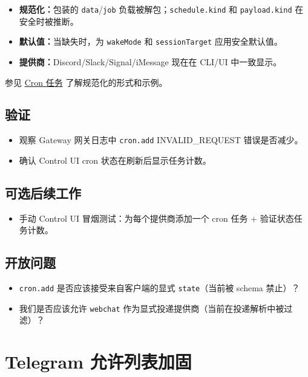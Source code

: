 \begin{itemize}
  \item \textbf{规范化：}包装的 \texttt{data}/\texttt{job} 负载被解包；\texttt{schedule.kind} 和 \texttt{payload.kind} 在安全时被推断。
  \item \textbf{默认值：}当缺失时，为 \texttt{wakeMode} 和 \texttt{sessionTarget} 应用安全默认值。
  \item \textbf{提供商：}Discord/Slack/Signal/iMessage 现在在 CLI/UI 中一致显示。
\end{itemize}


参见 \href{/automation/cron-jobs}{Cron 任务} 了解规范化的形式和示例。

\subsection{验证}


\begin{itemize}
  \item 观察 Gateway 网关日志中 \texttt{cron.add} INVALID\_REQUEST 错误是否减少。
  \item 确认 Control UI cron 状态在刷新后显示任务计数。
\end{itemize}


\subsection{可选后续工作}


\begin{itemize}
  \item 手动 Control UI 冒烟测试：为每个提供商添加一个 cron 任务 + 验证状态任务计数。
\end{itemize}


\subsection{开放问题}


\begin{itemize}
  \item \texttt{cron.add} 是否应该接受来自客户端的显式 \texttt{state}（当前被 schema 禁止）？
  \item 我们是否应该允许 \texttt{webchat} 作为显式投递提供商（当前在投递解析中被过滤）？
\end{itemize}



\clearpage

\section{Telegram 允许列表加固}


